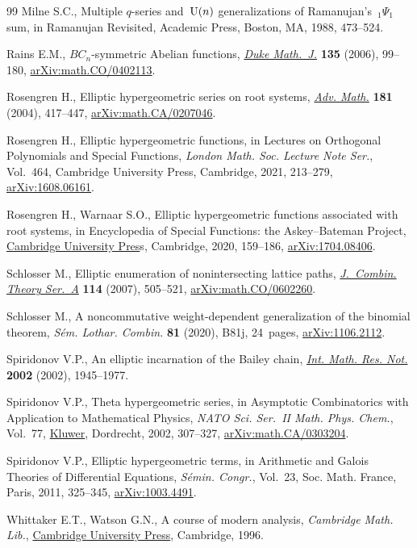 \begin{thebibliography}{99}
Milne S.C., Multiple {$q$}-series and~{${\rm U}(n)$} generalizations of
 {R}amanujan's~{$_1\Psi_1$} sum, in Ramanujan {R}evisited, Academic Press,
 Boston, MA, 1988, 473--524.

Rains E.M., {$BC_n$}-symmetric {A}belian functions,
 \href{https://doi.org/10.1215/S0012-7094-06-13513-5}{\textit{Duke Math.~J.}}
 \textbf{135} (2006), 99--180,
 \href{http://arxiv.org/abs/math.CO/0402113}{arXiv:math.CO/0402113}.

Rosengren H., Elliptic hypergeometric series on root systems,
 \href{https://doi.org/10.1016/S0001-8708(03)00071-9}{\textit{Adv. Math.}}
 \textbf{181} (2004), 417--447,
 \href{http://arxiv.org/abs/math.CA/0207046}{arXiv:math.CA/0207046}.

Rosengren H., Elliptic hypergeometric functions, in Lectures on {O}rthogonal
 {P}olynomials and {S}pecial {F}unctions, \textit{London Math. Soc. Lecture
 Note Ser.}, Vol.~464, Cambridge University Press, Cambridge, 2021, 213--279,
 \href{http://arxiv.org/abs/1608.06161}{arXiv:1608.06161}.

Rosengren H., Warnaar S.O., Elliptic hypergeometric functions associated with
 root systems, in Encyclopedia of {S}pecial {F}unctions: the
 {A}skey--{B}ateman {P}roject,
 \href{https://doi.org/10.1017/9780511777165.007}{Cambridge University Pres}s,
 Cambridge, 2020, 159--186,
 \href{http://arxiv.org/abs/1704.08406}{arXiv:1704.08406}.

Schlosser M., Elliptic enumeration of nonintersecting lattice paths,
 \href{https://doi.org/10.1016/j.jcta.2006.07.002}{\textit{J.~Combin. Theory
 Ser.~A}} \textbf{114} (2007), 505--521,
 \href{http://arxiv.org/abs/math.CO/0602260}{arXiv:math.CO/0602260}.

Schlosser M., A noncommutative weight-dependent generalization of the binomial
 theorem, \textit{S\'em. Lothar. Combin.} \textbf{81} (2020), B81j, 24~pages,
 \href{http://arxiv.org/abs/1106.2112}{arXiv:1106.2112}.

Spiridonov V.P., An elliptic incarnation of the {B}ailey chain,
 \href{https://doi.org/10.1155/S1073792802205127}{\textit{Int. Math. Res.
 Not.}} \textbf{2002} (2002), 1945--1977.

Spiridonov V.P., Theta hypergeometric series, in Asymptotic {C}ombinatorics
 with {A}pplication to {M}athematical {P}hysics, \textit{NATO Sci. Ser.~II
 Math. Phys. Chem.}, Vol.~77,
 \href{https://doi.org/10.1007/978-94-010-0575-3_15}{Kluwer}, Dordrecht, 2002,
 307--327, \href{http://arxiv.org/abs/math.CA/0303204}{arXiv:math.CA/0303204}.

Spiridonov V.P., Elliptic hypergeometric terms, in Arithmetic and {G}alois
 {T}heories of {D}ifferential {E}quations, \textit{S\'emin. Congr.}, Vol.~23,
 Soc. Math. France, Paris, 2011, 325--345,
 \href{http://arxiv.org/abs/1003.4491}{arXiv:1003.4491}.

Whittaker E.T., Watson G.N., A course of modern analysis, \textit{Cambridge Math. Lib.},
 \href{https://doi.org/10.1017/CBO9780511608759}{Cambridge University Press},
 Cambridge, 1996.

\end{thebibliography}
